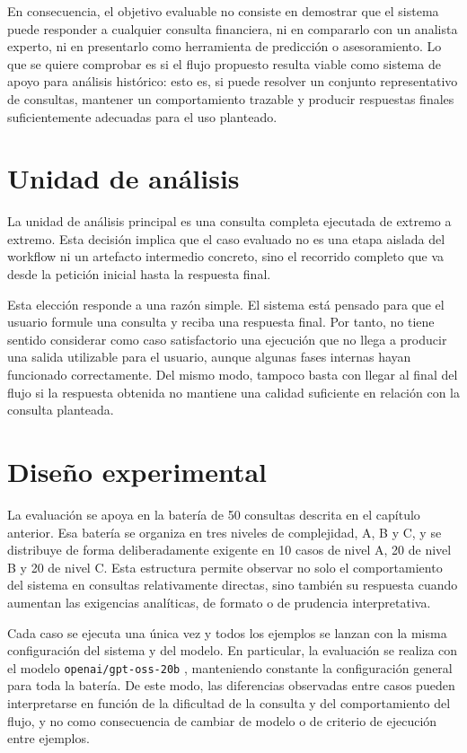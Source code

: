 En consecuencia, el objetivo evaluable no consiste en demostrar que el sistema puede responder a cualquier consulta financiera, ni en compararlo con un
analista experto, ni en presentarlo como herramienta de predicci\'on o asesoramiento. Lo que se quiere comprobar es si el flujo propuesto resulta
viable como sistema de apoyo para an\'alisis hist\'orico: esto es, si puede resolver un conjunto representativo de consultas, mantener un comportamiento
trazable y producir respuestas finales suficientemente adecuadas para el uso planteado.

\section{Unidad de an\'alisis}

La unidad de an\'alisis principal es una consulta completa ejecutada de extremo a extremo. Esta decisi\'on implica que el caso evaluado no es una etapa aislada
del workflow ni un artefacto intermedio concreto, sino el recorrido completo que va desde la petici\'on inicial hasta la respuesta final.

Esta elecci\'on responde a una raz\'on simple. El sistema est\'a pensado para que el usuario formule una consulta y reciba una respuesta final. Por tanto, no
tiene sentido considerar como caso satisfactorio una ejecuci\'on que no llega a producir una salida utilizable para el usuario, aunque algunas fases internas
hayan funcionado correctamente. Del mismo modo, tampoco basta con llegar al final del flujo si la respuesta obtenida no mantiene una calidad suficiente en
relaci\'on con la consulta planteada.

\section{Dise\~no experimental}

La evaluaci\'on se apoya en la bater\'ia de 50 consultas descrita en el cap\'itulo anterior. Esa bater\'ia se organiza en tres niveles de complejidad,
A, B y C, y se distribuye de forma deliberadamente exigente en 10 casos de nivel A, 20 de nivel B y 20 de nivel C. Esta estructura permite observar no
solo el comportamiento del sistema en consultas relativamente directas, sino tambi\'en su respuesta cuando aumentan las exigencias anal\'iticas, de formato o
de prudencia interpretativa.

Cada caso se ejecuta una \'unica vez y todos los ejemplos se lanzan con la misma configuraci\'on del sistema y del modelo. En particular, la evaluaci\'on
se realiza con el modelo \texttt{openai/gpt-oss-20b} \cite{openai2025gptossmodelcard}, manteniendo constante la configuraci\'on general para toda la bater\'ia. De 
este modo, las diferencias observadas entre casos pueden interpretarse en funci\'on de la dificultad de la consulta y del comportamiento del flujo, y no como 
consecuencia de cambiar de modelo o de criterio de ejecuci\'on entre ejemplos.

